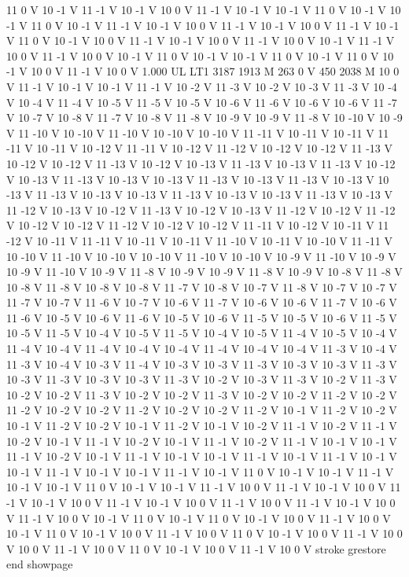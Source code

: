 {11 0 V
10 -1 V
11 -1 V
10 -1 V
10 0 V
11 -1 V
10 -1 V
10 -1 V
11 0 V
10 -1 V
10 -1 V
11 0 V
10 -1 V
11 -1 V
10 -1 V
10 0 V
11 -1 V
10 -1 V
10 0 V
11 -1 V
10 -1 V
11 0 V
10 -1 V
10 0 V
11 -1 V
10 -1 V
10 0 V
11 -1 V
10 0 V
10 -1 V
11 -1 V
10 0 V
11 -1 V
10 0 V
10 -1 V
11 0 V
10 -1 V
10 -1 V
11 0 V
10 -1 V
11 0 V
10 -1 V
10 0 V
11 -1 V
10 0 V
1.000 UL
LT1
3187 1913 M
263 0 V
450 2038 M
10 0 V
11 -1 V
10 -1 V
10 -1 V
11 -1 V
10 -2 V
11 -3 V
10 -2 V
10 -3 V
11 -3 V
10 -4 V
10 -4 V
11 -4 V
10 -5 V
11 -5 V
10 -5 V
10 -6 V
11 -6 V
10 -6 V
10 -6 V
11 -7 V
10 -7 V
10 -8 V
11 -7 V
10 -8 V
11 -8 V
10 -9 V
10 -9 V
11 -8 V
10 -10 V
10 -9 V
11 -10 V
10 -10 V
11 -10 V
10 -10 V
10 -10 V
11 -11 V
10 -11 V
10 -11 V
11 -11 V
10 -11 V
10 -12 V
11 -11 V
10 -12 V
11 -12 V
10 -12 V
10 -12 V
11 -13 V
10 -12 V
10 -12 V
11 -13 V
10 -12 V
10 -13 V
11 -13 V
10 -13 V
11 -13 V
10 -12 V
10 -13 V
11 -13 V
10 -13 V
10 -13 V
11 -13 V
10 -13 V
11 -13 V
10 -13 V
10 -13 V
11 -13 V
10 -13 V
10 -13 V
11 -13 V
10 -13 V
10 -13 V
11 -13 V
10 -13 V
11 -12 V
10 -13 V
10 -12 V
11 -13 V
10 -12 V
10 -13 V
11 -12 V
10 -12 V
11 -12 V
10 -12 V
10 -12 V
11 -12 V
10 -12 V
10 -12 V
11 -11 V
10 -12 V
10 -11 V
11 -12 V
10 -11 V
11 -11 V
10 -11 V
10 -11 V
11 -10 V
10 -11 V
10 -10 V
11 -11 V
10 -10 V
11 -10 V
10 -10 V
10 -10 V
11 -10 V
10 -10 V
10 -9 V
11 -10 V
10 -9 V
10 -9 V
11 -10 V
10 -9 V
11 -8 V
10 -9 V
10 -9 V
11 -8 V
10 -9 V
10 -8 V
11 -8 V
10 -8 V
11 -8 V
10 -8 V
10 -8 V
11 -7 V
10 -8 V
10 -7 V
11 -8 V
10 -7 V
10 -7 V
11 -7 V
10 -7 V
11 -6 V
10 -7 V
10 -6 V
11 -7 V
10 -6 V
10 -6 V
11 -7 V
10 -6 V
11 -6 V
10 -5 V
10 -6 V
11 -6 V
10 -5 V
10 -6 V
11 -5 V
10 -5 V
10 -6 V
11 -5 V
10 -5 V
11 -5 V
10 -4 V
10 -5 V
11 -5 V
10 -4 V
10 -5 V
11 -4 V
10 -5 V
10 -4 V
11 -4 V
10 -4 V
11 -4 V
10 -4 V
10 -4 V
11 -4 V
10 -4 V
10 -4 V
11 -3 V
10 -4 V
11 -3 V
10 -4 V
10 -3 V
11 -4 V
10 -3 V
10 -3 V
11 -3 V
10 -3 V
10 -3 V
11 -3 V
10 -3 V
11 -3 V
10 -3 V
10 -3 V
11 -3 V
10 -2 V
10 -3 V
11 -3 V
10 -2 V
11 -3 V
10 -2 V
10 -2 V
11 -3 V
10 -2 V
10 -2 V
11 -3 V
10 -2 V
10 -2 V
11 -2 V
10 -2 V
11 -2 V
10 -2 V
10 -2 V
11 -2 V
10 -2 V
10 -2 V
11 -2 V
10 -1 V
11 -2 V
10 -2 V
10 -1 V
11 -2 V
10 -2 V
10 -1 V
11 -2 V
10 -1 V
10 -2 V
11 -1 V
10 -2 V
11 -1 V
10 -2 V
10 -1 V
11 -1 V
10 -2 V
10 -1 V
11 -1 V
10 -2 V
11 -1 V
10 -1 V
10 -1 V
11 -1 V
10 -2 V
10 -1 V
11 -1 V
10 -1 V
10 -1 V
11 -1 V
10 -1 V
11 -1 V
10 -1 V
10 -1 V
11 -1 V
10 -1 V
10 -1 V
11 -1 V
10 -1 V
11 0 V
10 -1 V
10 -1 V
11 -1 V
10 -1 V
10 -1 V
11 0 V
10 -1 V
10 -1 V
11 -1 V
10 0 V
11 -1 V
10 -1 V
10 0 V
11 -1 V
10 -1 V
10 0 V
11 -1 V
10 -1 V
10 0 V
11 -1 V
10 0 V
11 -1 V
10 -1 V
10 0 V
11 -1 V
10 0 V
10 -1 V
11 0 V
10 -1 V
11 0 V
10 -1 V
10 0 V
11 -1 V
10 0 V
10 -1 V
11 0 V
10 -1 V
10 0 V
11 -1 V
10 0 V
11 0 V
10 -1 V
10 0 V
11 -1 V
10 0 V
10 0 V
11 -1 V
10 0 V
11 0 V
10 -1 V
10 0 V
11 -1 V
10 0 V
stroke
grestore
end
showpage
}
